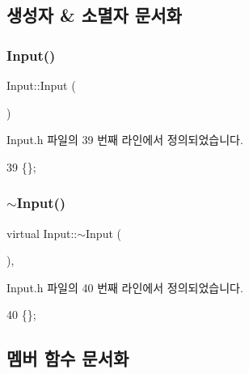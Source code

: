 \subsection{생성자 \& 소멸자 문서화}
\mbox{\label{class_input_abae3f379d3f157cf42dc857309832dba}} 
\subsubsection{\texorpdfstring{Input()}{Input()}}
{\footnotesize\ttfamily Input\+::\+Input (\begin{DoxyParamCaption}{ }\end{DoxyParamCaption})\hspace{0.3cm}{\ttfamily [inline]}}



Input.\+h 파일의 39 번째 라인에서 정의되었습니다.


\begin{DoxyCode}
39 \{\};
\end{DoxyCode}
\mbox{\label{class_input_a230646fa6e6433b4d9ac3535b7d52087}} 
\subsubsection{\texorpdfstring{$\sim$\+Input()}{~Input()}}
{\footnotesize\ttfamily virtual Input\+::$\sim$\+Input (\begin{DoxyParamCaption}{ }\end{DoxyParamCaption})\hspace{0.3cm}{\ttfamily [inline]}, {\ttfamily [virtual]}}



Input.\+h 파일의 40 번째 라인에서 정의되었습니다.


\begin{DoxyCode}
40 \{\};
\end{DoxyCode}


\subsection{멤버 함수 문서화}
\mbox{\label{class_input_a5917709c5d9cf1270d430667982895d1}} 
